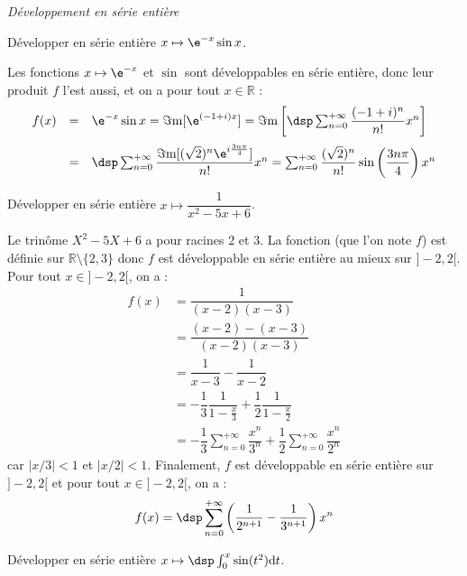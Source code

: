 \documentclass[a4paper,10pt]{report}
\begin{document}
\medskip

\begin{center}
\textit{{ {\large Développement en série entière}}}
\end{center}

\medskip

\begin{Exa} Développer en série entière $x \mapsto \e^{-x}\sin x$.
\end{Exa}

\corr Les fonctions $x\mapsto\e^{-x}$ et $\sin$ sont développables en série entière, donc leur produit $f$ l'est aussi, et on a pour tout $x\in\mathbb{R}$ : 
\[
\begin{array}{rcl}
f(x) &= & \e^{-x}\sin x=\Im\mathrm{m}[\e^{(-1+i)x}]=\Im\mathrm{m}\left[\dsp\sum_{n=0}^{+\infty}\dfrac{(-1+i)^n}{n!}x^n\right]\\
\vspace*{-0.2cm}\\
& = & \dsp\sum_{n=0}^{+\infty}\dfrac{\Im\mathrm{m}[(\sqrt{2})^n\e^{i\frac{3n\pi}{4}}]}{n!}x^n=\sum_{n=0}^{+\infty}\dfrac{(\sqrt{2})^n}{n!}\sin\left(\dfrac{3n\pi}{4}\right)x^n
\end{array}
\]

\begin{Exa} Développer en série entière $x \mapsto \dfrac{1}{x^2-5x+6}$.
\end{Exa}

\corr Le trinôme $X^2-5X+6$ a pour racines $2$ et $3$. La fonction (que l'on note $f$) est définie sur $\mathbb{R} \setminus \lbrace 2,3 \rbrace$ donc $f$ est développable en série entière au mieux sur $]-2,2[$. Pour tout $x \in ]-2,2[$, on a :
\begin{align*}
f(x) & = \dfrac{1}{(x-2)(x-3)}\\
&  = \dfrac{(x-2)-(x-3)}{(x-2)(x-3)}  \\
& = \dfrac{1}{x-3} - \dfrac{1}{x-2} \\
& = -\dfrac{1}{3}\dfrac{1}{1-\frac{x}{3}}+\dfrac{1}{2}\dfrac{1}{1-\frac{x}{2}} \\
& =-\dfrac{1}{3}\sum_{n=0}^{+\infty}\dfrac{x^n}{3^n}+\dfrac{1}{2}\sum_{n=0}^{+\infty}\dfrac{x^n}{2^n}
\end{align*} 
car $\vert x/3 \vert <1$ et $\vert x/2 \vert <1$. Finalement, $f$ est développable en série entière sur $]-2,2[$ et pour tout $x \in ]-2,2[$, on a :
$$ f(x) = \dsp\sum_{n=0}^{+\infty}\left(  \dfrac{1}{2^{n+1}}-\dfrac{1}{3^{n+1}}\right)x^n$$

\begin{Exa} Développer en série entière $x \mapsto \dsp\int_0^x\sin(t^2)\mathrm{d}t$.
\end{Exa}
\end{document}
